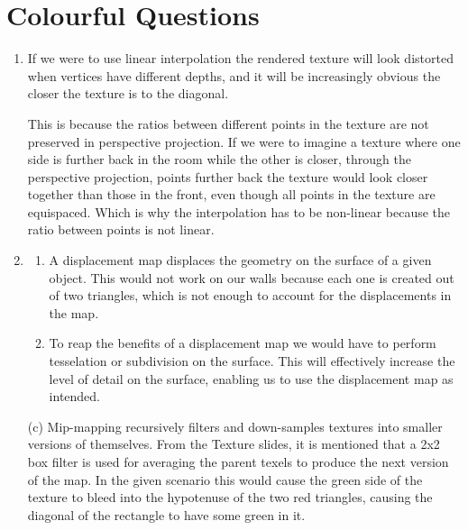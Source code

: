 \documentclass[11pt,a4paper]{report}
\begin{document}
\section{Colourful Questions}
\begin{enumerate}[label=(\alph*)]\setcounter{enumi}{0}
	\item If we were to use linear interpolation the rendered texture will look distorted when vertices have different depths, and it will be increasingly obvious the closer the texture is to the diagonal.
	
	This is because the ratios between different points in the texture are not preserved in perspective projection.
	If we were to imagine a texture where one side is further back in the room while the other is closer, through the perspective projection, points further back the texture would look closer together than those in the front, even though all points in the texture are equispaced. Which is why the interpolation has to be non-linear because the ratio between points is not linear.
	
	\item \begin{enumerate}[label=(\alph*)]\setcounter{enumi}{0}
		\item A displacement map displaces the geometry on the surface of a given object. This would not work on our walls because each one is created out of two triangles, which is not enough to account for the displacements in the map.
		\item To reap the benefits of a displacement map we would have to perform tesselation or subdivision on the surface. This will effectively increase the level of detail on the surface, enabling us to use the displacement map as intended. \end{enumerate}

	\item[(c)] Mip-mapping recursively filters and down-samples textures into smaller versions of themselves. From the Texture slides, it is mentioned that a 2x2 box filter is used for averaging the parent texels to produce the next version of the map.
	In the given scenario this would cause the green side of the texture to bleed into the hypotenuse of the two red triangles, causing the diagonal of the rectangle to have some green in it.
	
	
	
\end{enumerate}

\clearpage
\end{document}
